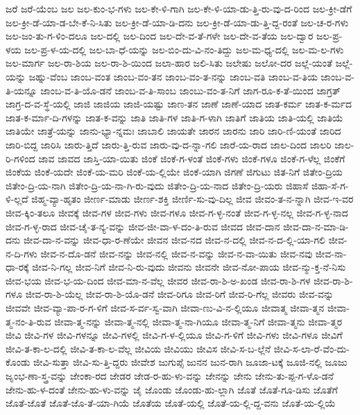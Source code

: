{ಜರೆ
ಜರೆ-ಯೆಂಬ
ಜಲ
ಜಲ-ಕುಂ-ಭ-ಗಳು
ಜಲ-ಕೇ-ಳಿ-ಗಾಗಿ
ಜಲ-ಕೇ-ಳಿ-ಯಾ-ಡು-ತ್ತಿ-ರು-ವು-ದ-ರಿಂದ
ಜಲ-ಕ್ರೀ-ಡೆಗೆ
ಜಲ-ಕ್ರೀ-ಡೆ-ಯಾ-ಡ-ಬೇ-ಕೆ-ನಿ-ಸಿತು
ಜಲ-ಕ್ರೀ-ಡೆ-ಯಾ-ಡಿ-ದನು
ಜಲ-ಕ್ರೀ-ಡೆ-ಯಾ-ಡು-ತ್ತಿ-ದ್ದ-ರಂತೆ
ಜಲ-ಚ-ರ-ಗಳು
ಜಲ-ಜಂ-ತು-ಗ-ಳಿಂ-ದಲೂ
ಜಲ-ದಲ್ಲಿ
ಜಲ-ದಿಂದ
ಜಲ-ದೇ-ವ-ತೆ-ಗಳೇ
ಜಲ-ದೇ-ವ-ತೆಯ
ಜಲ-ದ್ವಾರ
ಜಲ-ಪ್ರ-ಳಯ
ಜಲ-ಪ್ರ-ಳ-ಯ-ದಲ್ಲಿ
ಜಲ-ಬಾ-ಧೆ-ಯನ್ನು
ಜಲ-ಬಿಂ-ದು-ವಿ-ನಂ-ತಿದ್ದು
ಜಲ-ಮ-ಧ್ಯ-ದಲ್ಲಿ
ಜಲ-ಮ-ಲ-ಗಳು
ಜಲ-ಮಾರ್ಗ
ಜಲ-ರಾ-ಶಿಯ
ಜಲ-ರಾ-ಶಿ-ಯಿಂದ
ಜಲಾ-ಹಾರ
ಜಲಿ-ಸಿತು
ಜಲೇಷು
ಜಲೋ-ದರ
ಜಲ್ಲೆ-ಯಂತೆ
ಜಲ್ಲೆ-ಯನ್ನು
ಜಹ್ನು-ವೆಂಬ
ಜಾಂಬ-ವಂತ
ಜಾಂಬ-ವಂ-ತನ
ಜಾಂಬ-ವಂ-ತ-ನನ್ನು
ಜಾಂಬ-ವತಿ
ಜಾಂಬ-ವ-ತಿಯ
ಜಾಂಬ-ವ-ತಿ-ಯನ್ನೂ
ಜಾಂಬ-ವ-ತಿ-ಯೊ-ಡನೆ
ಜಾಂಬ-ವ-ತಿ-ಸಾಂಬ
ಜಾಂಬು-ವಂ-ತ-ನಿಗೆ
ಜಾಗ-ರೂ-ಕ-ತೆ-ಯಿಂದ
ಜಾಗ್ರತ್
ಜಾಗ್ರ-ದ-ವ-ಸ್ಥೆ-ಯಲ್ಲಿ
ಜಾಜಿ
ಜಾಜಿಯ
ಜಾಜಿ-ಯಷ್ಟು
ಜಾಣ-ತನ
ಜಾಣೆ
ಜಾಣೆ-ಯಾದ
ಜಾತ-ಕರ್ಮ
ಜಾತ-ಕ-ರ್ಮದ
ಜಾತ-ಕ-ರ್ಮಾ-ದಿ-ಗಳನ್ನು
ಜಾತ-ಕ-ವನ್ನು
ಜಾತಿ
ಜಾತಿ-ಗಳ
ಜಾತಿ-ಗ-ಳಾಗಿ
ಜಾತಿಗೆ
ಜಾತಿಯ
ಜಾತಿ-ಯಲ್ಲಿ
ಜಾತಿಯೆ
ಜಾತಿಯೇ
ಜಾತ್ರೆ-ಯನ್ನು
ಜಾನು-ಭ್ಯಾ-ನ್ನಮಃ
ಜಾಬಾಲಿ
ಜಾಯತೇ
ಜಾರನ
ಜಾರನು
ಜಾರಿ
ಜಾರಿ-ಣಿ-ಯಂತೆ
ಜಾರಿದ
ಜಾರಿ-ಬಿದ್ದ
ಜಾರಿಸಿ
ಜಾರು-ತ್ತಿದೆ
ಜಾರು-ತ್ತಿ-ರುವ
ಜಾರು-ವು-ದ-ನ್ನಾ-ಗಲಿ
ಜಾರೆ-ಯ-ರಾದ
ಜಾಲ-ದಿಂದ
ಜಾಲರಿ
ಜಾಲ-ರಿ-ಗಳಿಂದ
ಜಾವ
ಜಾವದ
ಜಾಸ್ತಿ-ಯಾ-ಯಿತು
ಜಿಂಕೆ
ಜಿಂಕೆ-ಗ-ಳಂತೆ
ಜಿಂಕೆ-ಗಳು
ಜಿಂಕೆ-ಗಳೂ
ಜಿಂಕೆ-ಗ-ಳೆಲ್ಲ
ಜಿಂಕೆಗೆ
ಜಿಂಕೆಯ
ಜಿಂಕೆ-ಯದೇ
ಜಿಂಕೆ-ಯ-ಮರಿ
ಜಿಂಕೆ-ಯ-ಲ್ಲಿಯೇ
ಜಿಂಕೆ-ಯಾಗಿ
ಜಿಗಣೆ
ಜಿಗುಟು
ಜಿತ-ನಿಗೆ
ಜಿತೇಂ-ದ್ರಿಯ
ಜಿತೇಂ-ದ್ರಿ-ಯ-ನಾಗಿ
ಜಿತೇಂ-ದ್ರಿ-ಯ-ನಾ-ಗಿ-ರು-ವುದು
ಜಿತೇಂ-ದ್ರಿ-ಯ-ನಾದ
ಜಿತೇಂ-ದ್ರಿ-ಯರು
ಜಿಹಾಸೆ
ಜಿಹಾ-ಸೆ-ಗ-ಳಿ-ಲ್ಲದೆ
ಜಿಹ್ಮ-ವ್ಯಾ-ಹೃತಂ
ಜೀರ್ಣ-ಮಾಡು
ಜೀರ್ಣ-ಶಕ್ತಿ
ಜೀರ್ಣಿ-ಸು-ವು-ದಿಲ್ಲ
ಜೀವ
ಜೀವಂ-ತ-ನ-ನ್ನಾಗಿ
ಜೀವ-ಇ-ವರ
ಜೀವ-ಕ್ಕಿಂ-ತಲೂ
ಜೀವಕ್ಕೆ
ಜೀವ-ಗಳ
ಜೀವ-ಗಳು
ಜೀವ-ಗಳೂ
ಜೀವ-ಗ-ಳ್ಳ-ನಂತೆ
ಜೀವ-ಗ-ಳ್ಳ-ನಲ್ಲ
ಜೀವ-ಗ-ಳ್ಳ-ನಾದ
ಜೀವ-ಗ-ಳ್ಳ-ರಾದ
ಜೀವ-ಚೈ-ತ-ನ್ಯ-ವನ್ನು
ಜೀವ-ಜೀ-ವಾ-ಳ-ದಂ-ತಿ-ರುವ
ಜೀವದ
ಜೀವ-ದಾನ
ಜೀವ-ದಾ-ನ-ಮಾ-ಡಿ-ದನು
ಜೀವ-ದಾ-ನ-ವನ್ನು
ಜೀವ-ಧಾ-ರ-ಣೆಯೇ
ಜೀವನ
ಜೀವ-ನದ
ಜೀವ-ನ-ದಲ್ಲಿ
ಜೀವ-ನ-ದ-ಲ್ಲಿ-ಯಾ-ಗಲಿ
ಜೀವ-ನ-ದಿ-ಗಳು
ಜೀವ-ನ-ದೊ-ಡನೆ
ಜೀವ-ನನ್ನು
ಜೀವ-ನಲ್ಲಿ
ಜೀವ-ನ-ವನ್ನು
ಜೀವ-ನ-ವಾ-ಯಿತು
ಜೀವ-ನವು
ಜೀವ-ನಾ-ಧಾ-ರಕ್ಕೆ
ಜೀವ-ನಿ-ಗಲ್ಲ
ಜೀವ-ನಿಗೆ
ಜೀವ-ನಿ-ರು-ವುದು
ಜೀವನು
ಜೀವನೇ
ಜೀವ-ನೋ-ಪಾಯ
ಜೀವ-ನ್ಮು-ಕ್ತ-ನೆ-ನಿಸು
ಜೀವ-ಭಯ
ಜೀವ-ಭ-ಯ-ದಿಂದ
ಜೀವ-ಮಾ-ನ-ವೆಲ್ಲ
ಜೀವರ
ಜೀವ-ರಾ-ಶಿ-ಅ-ಖಂಡ
ಜೀವ-ರಾ-ಶಿ-ಗಳ
ಜೀವ-ರಾ-ಶಿ-ಗಳೂ
ಜೀವ-ರಾ-ಶಿ-ಯೆಲ್ಲ
ಜೀವ-ರಾ-ಶಿ-ಯೊ-ಡನೆ
ಜೀವ-ರಿಗೂ
ಜೀವ-ರಿಗೆ
ಜೀವ-ರಿ-ಗೆಲ್ಲ
ಜೀವರು
ಜೀವ-ವನ್ನು
ಜೀವವೇ
ಜೀವ-ವ್ಯಾ-ಪಾ-ರ-ಗ-ಳಿಗೆ
ಜೀವ-ಸ-ರ್ವ-ಸ್ವ-ವಾಗಿ
ಜೀವಾ-ಣು-ವಿ-ನ-ಲ್ಲಿಯೂ
ಜೀವಾತ್ಮ
ಜೀವಾ-ತ್ಮನ
ಜೀವಾ-ತ್ಮ-ನಂ-ತಿ-ರುವ
ಜೀವಾ-ತ್ಮ-ನನ್ನು
ಜೀವಾ-ತ್ಮ-ನಲ್ಲಿ
ಜೀವಾ-ತ್ಮ-ನಾ-ಗಿಯೂ
ಜೀವಾ-ತ್ಮ-ನಿಗೆ
ಜೀವಾ-ತ್ಮನು
ಜೀವಾ-ತ್ಮರ
ಜೀವಿ
ಜೀವಿ-ಗಳ
ಜೀವಿ-ಗಳನ್ನೂ
ಜೀವಿ-ಗಳಲ್ಲಿ
ಜೀವಿ-ಗ-ಳ-ಲ್ಲಿಯೂ
ಜೀವಿ-ಗ-ಳಿಗೆ
ಜೀವಿ-ಗಳು
ಜೀವಿ-ಗಳೂ
ಜೀವಿಗೆ
ಜೀವಿ-ತ-ಕಾ-ಲ-ದಲ್ಲಿ
ಜೀವಿ-ತ-ಕಾ-ಲ-ವೆಲ್ಲ
ಜೀವಿಯ
ಜೀವಿಯು
ಜೀವಿಸ
ಜೀವಿ-ಸ-ಬ-ಲ್ಲೆನೆ
ಜೀವಿ-ಸ-ಲಾ-ರೆ-ವೆಂ-ದು-ಕೊಂಡು
ಜೀವಿ-ಸುತ್ತಾ
ಜೀವಿ-ಸು-ತ್ತಿ-ದ್ದರು
ಜೀವೇಶ
ಜುಗುಪ್ಸೆ
ಜುನನ
ಜುನ-ರಾಗಿ
ಜೂಜಾ-ಟಕ್ಕೆ
ಜೂಜಿ-ನಲ್ಲಿ
ಜೂಜು
ಜೃಂಭ-ಣಾ-ಸ್ತ್ರ-ವನ್ನು
ಜೇಂಕಾ-ರದ
ಜೇಡರ
ಜೇಡ-ರ-ಹು-ಳು-ವನ್ನು
ಜೇನನ್ನು
ಜೇನು
ಜೇನು-ತು-ಪ್ಪ-ಗ-ಳೊ-ಡನೆ
ಜೇನು-ಹು-ಳ-ದಂತೆ
ಜೇನು-ಹು-ಳು-ವನ್ನು
ಜೈ
ಜೊಂಡು
ಜೊಂಡು-ಹು-ಲ್ಲಾಗಿ
ಜೊತೆ
ಜೊತೆ-ಗೂ-ಡಿಸು
ಜೊತೆಗೆ
ಜೊತೆ-ಜೊತೆ
ಜೊತೆ-ಜೊ-ತೆ-ಯಾ-ಗಿಯೆ
ಜೊತೆಯ
ಜೊತೆ-ಯಲ್ಲಿ
ಜೊತೆ-ಯ-ಲ್ಲಿ-ದ್ದ-ವನು
ಜೊತೆ-ಯ-ಲ್ಲಿಯೆ
}
